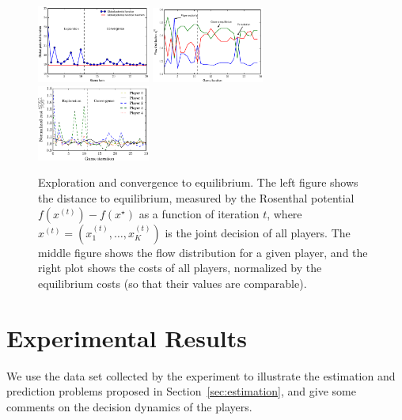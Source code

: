 \documentclass{sig-alternate-ipsn13}
\begin{document}
\begin{figure}
  \centering
  \includegraphics[width=0.33\textwidth]{images/global_potential_function}%
  \includegraphics[width=0.33\textwidth]{images/player_behavior}%
  \includegraphics[width=0.33\textwidth]{images/players_costs}%
  \caption{\footnotesize Exploration and convergence to equilibrium. The left figure shows the distance to equilibrium, measured by the Rosenthal potential $f(x^{(t)}) - f(x^\star)$ as a function of iteration $t$, where $x^{(t)} = (x_1^{(t)}, \dots, x_K^{(t)})$ is the joint decision of all players. The middle figure shows the flow distribution for a given player, and the right plot shows the costs of all players, normalized by the equilibrium costs (so that their values are comparable).}
  \label{fig:global_potential}
\end{figure}

\section{Experimental Results}
\label{sec:results}
We use the data set collected by the experiment to illustrate the estimation and prediction problems proposed in Section~\ref{sec:estimation}, and give some comments on the decision dynamics of the players.
\end{document}
